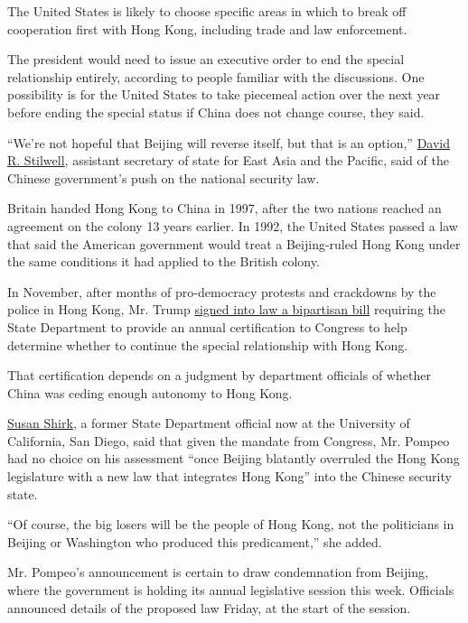 The United States is likely to choose specific areas in which to break
off cooperation first with Hong Kong, including trade and law
enforcement.

The president would need to issue an executive order to end the special
relationship entirely, according to people familiar with the
discussions. One possibility is for the United States to take piecemeal
action over the next year before ending the special status if China does
not change course, they said.

``We're not hopeful that Beijing will reverse itself, but that is an
option,''
\href{https://www.state.gov/biographies/david-r-stilwell/}{David R.
Stilwell}, assistant secretary of state for East Asia and the Pacific,
said of the Chinese government's push on the national security law.

Britain handed Hong Kong to China in 1997, after the two nations reached
an agreement on the colony 13 years earlier. In 1992, the United States
passed a law that said the American government would treat a
Beijing-ruled Hong Kong under the same conditions it had applied to the
British colony.

In November, after months of pro-democracy protests and crackdowns by
the police in Hong Kong, Mr. Trump
\href{https://www.lawfareblog.com/hong-kong-human-rights-and-democracy-act-redundant-still-worthwhile}{signed
into law a bipartisan bill} requiring the State Department to provide an
annual certification to Congress to help determine whether to continue
the special relationship with Hong Kong.

That certification depends on a judgment by department officials of
whether China was ceding enough autonomy to Hong Kong.

\href{https://gps.ucsd.edu/faculty-directory/susan-shirk.html}{Susan
Shirk}, a former State Department official now at the University of
California, San Diego, said that given the mandate from Congress, Mr.
Pompeo had no choice on his assessment ``once Beijing blatantly
overruled the Hong Kong legislature with a new law that integrates Hong
Kong'' into the Chinese security state.

``Of course, the big losers will be the people of Hong Kong, not the
politicians in Beijing or Washington who produced this predicament,''
she added.

Mr. Pompeo's announcement is certain to draw condemnation from Beijing,
where the government is holding its annual legislative session this
week. Officials announced details of the proposed law Friday, at the
start of the session.


